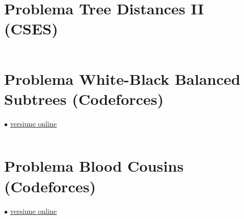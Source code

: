 \documentclass[../main.tex]{subfiles}
\begin{document}
\section{Problema Tree Distances II (CSES)}
\label{code:tree-distances-2}

\inputminted{cpp}{../src/trees/tree-distances-2.cpp}

\section{Problema White-Black Balanced Subtrees (Codeforces)}
\label{code:white-black-balanced-subtrees}
$\bullet$
\href{https://codeforces.com/contest/1676/submission/292873226}{versiune online}

\inputminted{cpp}{../src/trees/white-black-balanced-subtrees.cpp}

\section{Problema Blood Cousins (Codeforces)}
\label{code:blood-cousins}
$\bullet$
\href{https://codeforces.com/contest/208/submission/355679904}{versiune online}

\inputminted{cpp}{../src/trees/blood-cousins.cpp}
\end{document}
